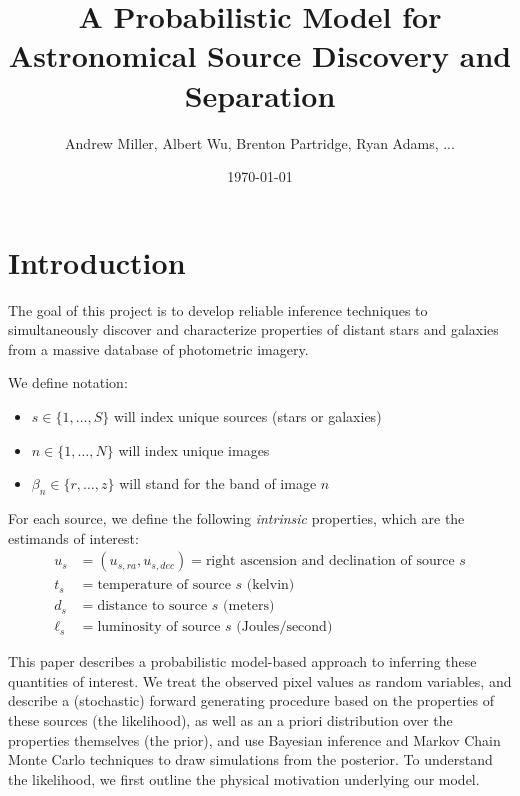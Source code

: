 \documentclass[11pt]{article}
\title{A Probabilistic Model for Astronomical Source Discovery and Separation}
\author{Andrew Miller, Albert Wu, Brenton Partridge, Ryan Adams, ...}
\date{\today}
\begin{document}
\maketitle

\section{Introduction}

The goal of this project is to develop reliable inference techniques to simultaneously discover and characterize properties of distant stars and galaxies from a massive database of photometric imagery.  

We define notation: 
\begin{itemize} \itemsep 0pt
\item $s \in \{1, \dots, S\}$ will index unique sources (stars or galaxies)
\item $n \in \{1, \dots, N\}$ will index unique images
\item $\beta_n \in \{r, \dots, z\}$ will stand for the band of image $n$
\end{itemize}

For each source, we define the following \emph{intrinsic} properties, which are the estimands of interest: 
\begin{align*}
  u_s &= (u_{s,ra}, u_{s,dec}) = \text{right ascension and declination of source $s$} \\
  t_s &= \text{temperature of source $s$ (kelvin)} \\
  d_s &= \text{distance to source $s$ (meters)} \\
  \ell_s &= \text{luminosity of source $s$ (Joules/second)} 
\end{align*}

This paper describes a probabilistic model-based approach to inferring these quantities of interest.  We treat the observed pixel values as random variables, and describe a (stochastic) forward generating procedure based on the properties of these sources (the likelihood), as well as an a priori distribution over the properties themselves (the prior), and use Bayesian inference and Markov Chain Monte Carlo techniques to draw simulations from the posterior.  To understand the likelihood, we first outline the physical motivation underlying our model.  
\end{document}
